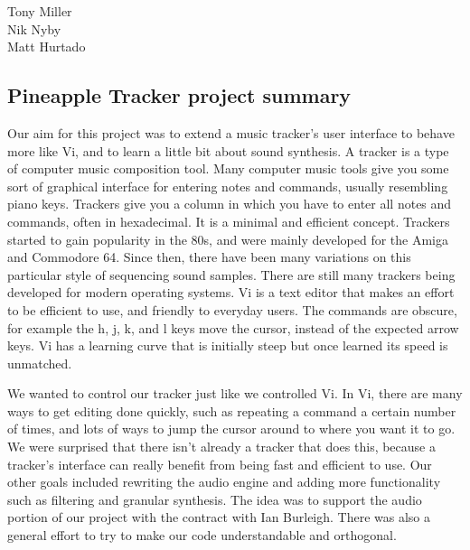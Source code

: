 \documentclass[12pt,letterpaper]{article}
\begin{document}
\begin{flushright}
Tony Miller\\
Nik Nyby\\
Matt Hurtado
\end{flushright}

\begin{center}
\section*{Pineapple Tracker project summary}
\end{center}


\doublespacing

\par
Our aim for this project was to extend a music tracker's user interface to behave more like Vi, and to learn a little bit about sound synthesis. A tracker is a type of computer music composition tool. Many computer music tools give you some sort of graphical interface for entering notes and commands, usually resembling piano keys. Trackers give you a column in which you have to enter all notes and commands, often in hexadecimal. It is a minimal and efficient concept. Trackers started to gain popularity in the 80s, and were mainly developed for the Amiga and Commodore 64. Since then, there have been many variations on this particular style of sequencing sound samples. There are still many trackers being developed for modern operating systems. Vi is a text editor that makes an effort to be efficient to use, and friendly to everyday users. The commands are obscure, for example the h, j, k, and l keys move the cursor, instead of the expected arrow keys. Vi has a learning curve that is initially steep but once learned its speed is unmatched.

\par
We wanted to control our tracker just like we controlled Vi. In Vi, there are many ways to get editing done quickly, such as repeating a command a certain number of times, and lots of ways to jump the cursor around to where you want it to go. We were surprised that there isn't already a tracker that does this, because a tracker's interface can really benefit from being fast and efficient to use. Our other goals included rewriting the audio engine and adding more functionality such as filtering and granular synthesis. The idea was to support the audio portion of our project with the contract with Ian Burleigh. There was also a general effort to try to make our code understandable and orthogonal.
\end{document}
